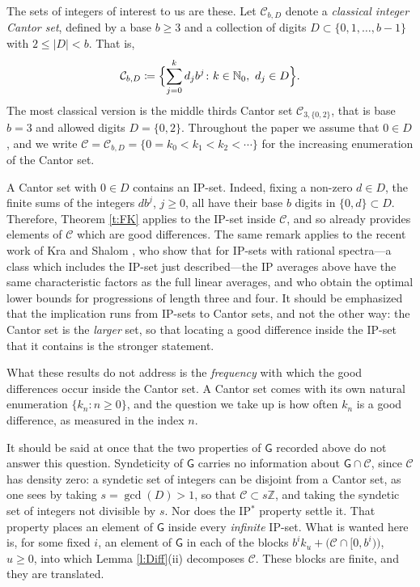 \smallskip 

The sets of integers of interest to us are these.  
Let $\mathcal{C}_{b,D}$ denote a \emph{classical integer Cantor set}, defined by a base $b\geq 3$ 
and a collection of digits 
$ D \subset \{0,1 , \ldots, b-1\}$ with $ 2\leq \lvert D \rvert < b$.  
That is, 
\begin{equation} \label{e:Cantor}
\mathcal{C}_{b, D}  \coloneqq 
\Bigl\{ 
 \sum_{j=0}^k d_j b ^{j} 
 \colon  k\in \mathbb{N}_0 ,\ d_j \in  D
\Bigr\}. 
\end{equation}
The most classical version is the middle thirds Cantor set $\mathcal{C}_{3,\{ 0, 2 \}}$, that is base $b=3$ 
and allowed digits $D= \{0,2\}$.  
Throughout the paper we assume that $0 \in D$, and we write 
$\mathcal C = \mathcal C_{b,D} = \{ 0=k_0 < k_1 < k_2 < \cdots\}$ for the increasing enumeration of the Cantor set.  

A Cantor set with $0 \in D$ contains an IP-set.  Indeed, fixing a non-zero $d \in D$, 
the finite sums of the integers $d b ^{j}$, $j \geq 0$, all have their base $b$ digits in $\{0,d\} \subset D$.  
Therefore, Theorem \ref{t:FK} applies to the IP-set inside $\mathcal C$, and so already provides 
elements of $\mathcal C$ which are good differences.  
The same remark applies to the recent work of Kra and Shalom \cite{kra2025ergodicaverageslargeintersection}, 
who show that for IP-sets with rational spectra---a class which includes the IP-set just described---the  
IP averages above have the same characteristic factors as the full linear averages, and who obtain 
the optimal lower bounds for progressions of length three and four.  
It should be emphasized that the implication runs from IP-sets to Cantor sets, and not the other way:  
the Cantor set is the \emph{larger} set, so that locating a good difference inside the IP-set that it contains is the stronger statement.  

\smallskip 

What these results do not address is the \emph{frequency} with which the good differences occur inside the Cantor set.  
A Cantor set comes with its own natural enumeration $\{k_n \colon n \geq 0\}$, and the question we take up is how often 
$k_n$ is a good difference, as measured in the index $n$.  

It should be said at once that the two properties of $\mathsf G$ recorded above do not answer this question.  
Syndeticity of $\mathsf G$ carries no information about $\mathsf G \cap \mathcal C$, since $\mathcal C$ has density zero: 
a syndetic set of integers can be disjoint from a Cantor set, as one sees by taking $s = \gcd (D)>1$, so that $\mathcal C \subset s \mathbb Z$, 
and taking the syndetic set of integers not divisible by $s$.  
Nor does the IP$^{\ast}$ property settle it.  That property places an element of $\mathsf G$ inside every \emph{infinite} IP-set.  
What is wanted here is, for some fixed $i$, an element of $\mathsf G$ in each of the blocks 
$b ^{i}k_u + \bigl( \mathcal C \cap [0,b ^{i}) \bigr)$, $u \geq 0$, into which Lemma \ref{l:Diff}(ii) decomposes $\mathcal C$.  
These blocks are finite, and they are translated.  

